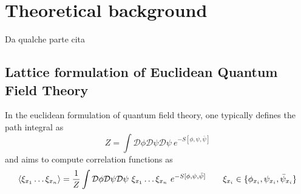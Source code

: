 \chapter{Theoretical background}
\label{chap:theoretical_background}

Da qualche parte cita \cite{carosso2020novel}

\section{Lattice formulation of Euclidean Quantum Field Theory}
\label{sec:lattice_formulation}
In the euclidean formulation of quantum field theory, one typically defines the path integral as 
\begin{equation}
    Z = \int \mathcal{D}\phi\mathcal{D}\psi\mathcal{D}\psi \ e^{-S[\phi, \psi, \bar\psi]}
    \label{eq:path_integral_generic}
\end{equation}
and aims to compute correlation functions as
\begin{equation*}
        \left\langle \xi_{x_1} \dots \xi_{x_n}  \right\rangle = \frac{1}{Z} \int \mathcal{D}\phi\mathcal{D}\psi\mathcal{D}\psi \ \xi_{x_1} \dots \xi_{x_n} \ e^{-S[\phi, \psi, \bar\psi]} \qquad \xi_{x_i} \in \{\phi_{x_i}, \psi_{x_i}, \bar\psi_{x_i}\} \\
\end{equation*}

